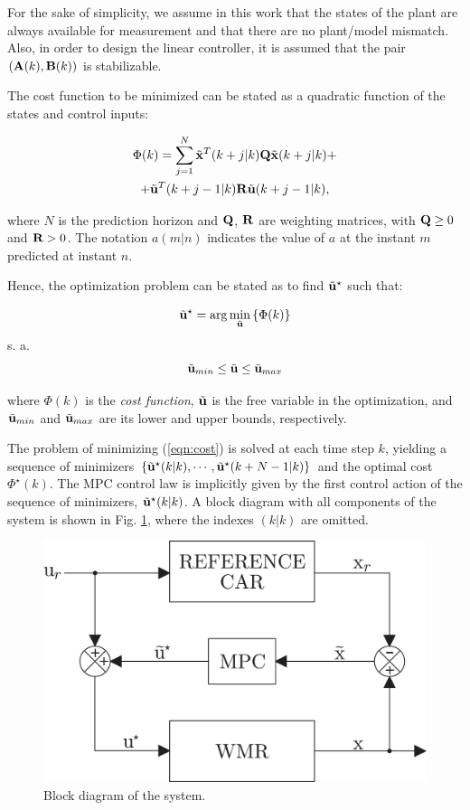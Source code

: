 \documentclass[conference]{IEEEtran} %
\begin{document}
For the sake of simplicity, we assume in this work that the states of the
plant are always available for measurement and that there are no plant/model
mismatch. Also, in order to design the linear controller, it is assumed that
the pair $({\bf A}(k),{\bf B}(k))$ is stabilizable.

The cost function to be minimized can be stated as a quadratic function of
the states and control inputs:

\begin{multline}\label{eqn:cost}
	\Phi(k) = \sum_{j=1}^{N}\tilde{\bf x}^T(k+j|k){\bf Q}\tilde{\bf x}(k+j|k) + \\ + \tilde{\bf u}^T(k+j-1|k){\bf R}\tilde{\bf u}(k+j-1|k),
\end{multline}

\noindent where $N$ is the prediction horizon and ${\bf Q}$, ${\bf R}$ are
weighting matrices, with ${\bf Q}\geq 0$ and ${\bf R}>0$. The notation
$a(m|n)$ indicates the value of $a$ at the instant $m$ predicted at instant
$n$.

Hence, the optimization problem can be stated as to find $\tilde{\bf
u}^\star$ such that:

\begin{equation*}
	\tilde{\bf u}^\star = \arg\min_{\tilde{\bf u}}\left\{\Phi(k)\right\}
\end{equation*}
\noindent s. a.
\begin{equation*}
	\tilde{\bf u}_{min} \leq \tilde{\bf u} \leq \tilde{\bf u}_{max}
\end{equation*}

\noindent where $\Phi(k)$ is the {\em cost function}, $\tilde{\bf u}$ is the
free variable in the optimization, and $\tilde{\bf u}_{min}$ and
$\tilde{\bf u}_{max}$ are its lower and upper bounds, respectively.

The problem of minimizing (\ref{eqn:cost}) is solved at each time step $k$,
yielding a sequence of minimizers $\{\tilde{\bf
u}^\star(k|k),\cdots,\tilde{\bf u}^\star(k+N-1|k)\}$ and the optimal cost
$\Phi^\star(k)$. The MPC control law is implicitly given by the first
control action of the sequence of minimizers, $\tilde{\bf u}^\star(k|k)$. A
block diagram with all components of the system is shown in Fig.
\ref{fig:bloco}, where the indexes $(k|k)$ are omitted.

\begin{figure}[htbp]
	\centering
	\includegraphics[width=.84\linewidth]{Figures/bloco.eps}
	\caption{Block diagram of the system.}
	\label{fig:bloco}
\end{figure}
\end{document}

